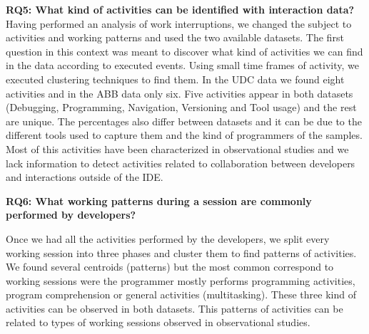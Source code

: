 \textbf{RQ5: What kind of activities can be identified with interaction data?}
Having performed an analysis of work interruptions, we changed the subject to activities and working patterns and used the two available datasets. The first question in this context was meant to discover what kind of activities we can find in the data according to executed events. Using small time frames of activity, we executed clustering techniques to find them. In the UDC data we found eight activities and in the ABB data only six. Five activities appear in both datasets (Debugging, Programming, Navigation, Versioning and Tool usage) and the rest are unique. The percentages also differ between datasets and it can be due to the different tools used to capture them and the kind of programmers of the samples. Most of this activities have been characterized in observational studies and we lack information to detect activities related to collaboration between developers and interactions outside of the IDE.

\textbf{RQ6: What working patterns during a session are commonly performed by developers?}

Once we had all the activities performed by the developers, we split every working session into three phases and cluster them to find patterns of activities. We found several centroids (patterns) but the most common correspond to working sessions were the programmer mostly performs programming activities, program comprehension or general activities (multitasking). These three kind of activities can be observed in both datasets. This patterns of activities can be related to types of working sessions observed in observational studies.



